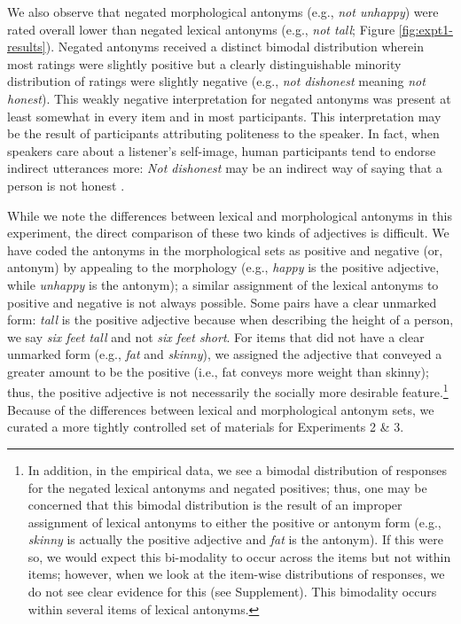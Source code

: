 \documentclass[floatsintext,doc]{apa6}
\let\rmarkdownfootnote\footnote%
\def\footnote{\protect\rmarkdownfootnote}
\begin{document}

We also observe that negated morphological antonyms (e.g., \emph{not unhappy}) were rated overall lower than negated lexical antonyms (e.g., \emph{not tall}; Figure \ref{fig:expt1-results}).
Negated antonyms received a distinct bimodal distribution wherein most ratings were slightly positive but a clearly distinguishable minority distribution of ratings were slightly negative (e.g., \emph{not dishonest} meaning \emph{not honest}).
This weakly negative interpretation for negated antonyms was present at least somewhat in every item and in most participants.
This interpretation may be the result of participants attributing politeness to the speaker.
In fact, when speakers care about a listener's self-image, human participants tend to endorse indirect utterances more:  \emph{Not dishonest} may be an indirect way of saying that a person is not honest \cite{Yoon2017}.

While we note the differences between lexical and morphological antonyms in this experiment, the direct comparison of these two kinds of adjectives is difficult. 
We have coded the antonyms in the morphological sets as positive and negative (or, antonym) by appealing to the morphology (e.g., \emph{happy} is the positive adjective, while \emph{unhappy} is the antonym); a similar assignment of the lexical antonyms to positive and negative is not always possible.
Some pairs have a clear unmarked form: \emph{tall} is the positive adjective because when describing the height of a person, we say \emph{six feet tall} and not \emph{six feet short}.
For items that did not have a clear unmarked form (e.g., \emph{fat} and \emph{skinny}), we assigned the adjective that conveyed a greater amount to be the positive (i.e., fat conveys more weight than skinny); thus, the positive adjective is not necessarily the socially more desirable feature.\footnote{
In addition, in the empirical data, we see a bimodal distribution of responses for the negated lexical antonyms and negated positives; thus, one may be concerned that this bimodal distribution is the result of an improper assignment of lexical antonyms to either the positive or antonym form (e.g., \emph{skinny} is actually the positive adjective and \emph{fat} is the antonym). 
If this were so, we would expect this bi-modality to occur across the items but not within items; however, when we look at the item-wise distributions of responses, we do not see clear evidence for this (see Supplement).
This bimodality occurs within several items of lexical antonyms.  
}
Because of the differences between lexical and morphological antonym sets, we curated a more tightly controlled set of materials for Experiments 2 \& 3. 
\end{document}

